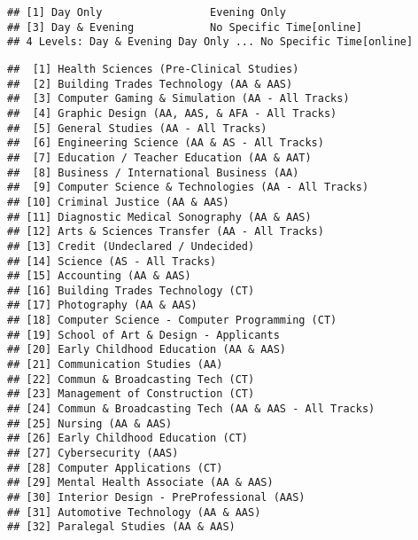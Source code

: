 \documentclass[]{article}
\newenvironment{Shaded}{\begin{snugshade}}{\end{snugshade}}
\newcommand{\KeywordTok}[1]{\textcolor[rgb]{0.13,0.29,0.53}{\textbf{#1}}}
\newcommand{\OperatorTok}[1]{\textcolor[rgb]{0.81,0.36,0.00}{\textbf{#1}}}
\newcommand{\NormalTok}[1]{#1}
\begin{document}
\begin{verbatim}
## [1] Day Only                 Evening Only            
## [3] Day & Evening            No Specific Time[online]
## 4 Levels: Day & Evening Day Only ... No Specific Time[online]
\end{verbatim}

\begin{Shaded}
\end{Shaded}

\begin{verbatim}
##  [1] Health Sciences (Pre-Clinical Studies)            
##  [2] Building Trades Technology (AA & AAS)             
##  [3] Computer Gaming & Simulation (AA - All Tracks)    
##  [4] Graphic Design (AA, AAS, & AFA - All Tracks)      
##  [5] General Studies (AA - All Tracks)                 
##  [6] Engineering Science (AA & AS - All Tracks)        
##  [7] Education / Teacher Education (AA & AAT)          
##  [8] Business / International Business (AA)            
##  [9] Computer Science & Technologies (AA - All Tracks) 
## [10] Criminal Justice (AA & AAS)                       
## [11] Diagnostic Medical Sonography (AA & AAS)          
## [12] Arts & Sciences Transfer (AA - All Tracks)        
## [13] Credit (Undeclared / Undecided)                   
## [14] Science (AS - All Tracks)                         
## [15] Accounting (AA & AAS)                             
## [16] Building Trades Technology (CT)                   
## [17] Photography (AA & AAS)                            
## [18] Computer Science - Computer Programming (CT)      
## [19] School of Art & Design - Applicants               
## [20] Early Childhood Education (AA & AAS)              
## [21] Communication Studies (AA)                        
## [22] Commun & Broadcasting Tech (CT)                   
## [23] Management of Construction (CT)                   
## [24] Commun & Broadcasting Tech (AA & AAS - All Tracks)
## [25] Nursing (AA & AAS)                                
## [26] Early Childhood Education (CT)                    
## [27] Cybersecurity (AAS)                               
## [28] Computer Applications (CT)                        
## [29] Mental Health Associate (AA & AAS)                
## [30] Interior Design - PreProfessional (AAS)           
## [31] Automotive Technology (AA & AAS)                  
## [32] Paralegal Studies (AA & AAS)                      

\end{verbatim}
\end{document}
